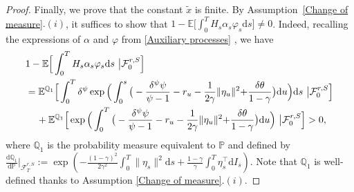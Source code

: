 \documentclass[10pt,a4paper]{amsart}
\begin{document}
\begin{proof}
	Finally, we prove that the constant $\widetilde{x}$ is finite. By Assumption~\ref{Change of measure}$.(i)$, it suffices to show that $1-\mathbb{E}\big[\int_{0}^{T}H_{s}\alpha_{s}\varphi_{s}\mathrm{d}s\big]\ne0$. Indeed, recalling the expressions of $\alpha$ and $\varphi$ from \eqref{Auxiliary processes} , we have
	\begin{align}\label{E1_Proposition 3.2}
		&1-\mathbb{E}\Big[\int_{0}^{T}H_{s}\alpha_{s}\varphi_{s}\mathrm{d}s~\big|\mathcal{F}_{0}^{r,S}\Big]\notag\\
		&=\mathbb{E}^{\mathbb{Q}_{1}}\Big[\int_{0}^{T}\delta^{\psi}\exp\Big(\int_{0}^{s}\big(-\frac{\delta^{\psi}\psi}{\psi-1}-r_{u}-\frac{1}{2\gamma}\|\eta_{u}\|^{2}{+\frac{\delta\theta}{1-\gamma}}\big)\mathrm{d}u\Big)\mathrm{d}s~\big|\mathcal{F}_{0}^{r,S}\Big]\notag\\
		&\phantom{xx}+\mathbb{E}^{\mathbb{Q}_{1}}\Big[\exp\Big(\int_{0}^{T}\big(-\frac{\delta^{\psi}\psi}{\psi-1}-r_{u}-\frac{1}{2\gamma}\|\eta_{u}\|^{2}{+\frac{\delta\theta}{1-\gamma}}\big)\mathrm{d}u\Big)~\big|\mathcal{F}_{0}^{r,S}\Big]>0,
	\end{align}
	where $\mathbb{Q}_{1}$ is the probability measure equivalent to $\mathbb{P}$ and defined by\\ $\frac{\mathrm{d}\mathbb{Q}_{1}}{\mathrm{d}\mathbb{P}}\big|_{\mathcal{F}_{T}^{r,S}}:=\exp\left(-\frac{(1-\gamma)^{2}}{2\gamma^{2}}\int_{0}^{T}\|\eta_{s}\|^{2}\mathrm{d}s+\frac{1-\gamma}{\gamma}\int_{0}^{T}\eta_{s}^{\top}\mathrm{d}I_{s}\right)$. Note that $\mathbb{Q}_{1}$ is well-defined thanks to Assumption \ref{Change of measure}$.(i)$.
\end{proof}
\end{document}
